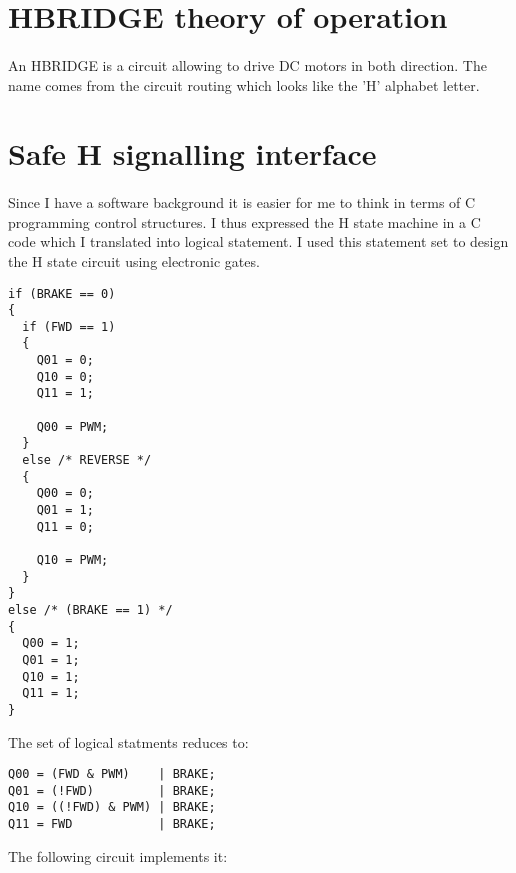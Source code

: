 \documentclass[12pt]{article}
\begin{document}
\section{HBRIDGE theory of operation}
\paragraph{} An HBRIDGE is a circuit allowing to drive DC motors in both direction. The name comes from the
circuit routing which looks like the 'H' alphabet letter.


\section{Safe H signalling interface}

\paragraph{} Since I have a software background it is easier for me to think in terms of C programming control
structures. I thus expressed the H state machine in a C code which I translated into logical statement. I used
this statement set to design the H state circuit using electronic gates.

\begin{tiny}
\lstset{language=C}
\begin{lstlisting}[frame=tb]
if (BRAKE == 0)
{
  if (FWD == 1)
  {
    Q01 = 0;
    Q10 = 0;
    Q11 = 1;

    Q00 = PWM;
  }
  else /* REVERSE */
  {
    Q00 = 0;
    Q01 = 1;
    Q11 = 0;

    Q10 = PWM;
  }
}
else /* (BRAKE == 1) */
{
  Q00 = 1;
  Q01 = 1;
  Q10 = 1;
  Q11 = 1;
}
\end{lstlisting}
\end{tiny}

The set of logical statments reduces to:
\begin{tiny}
\lstset{language=C}
\begin{lstlisting}[frame=tb]
Q00 = (FWD & PWM)    | BRAKE;
Q01 = (!FWD)         | BRAKE;
Q10 = ((!FWD) & PWM) | BRAKE;
Q11 = FWD            | BRAKE;
\end{lstlisting}
\end{tiny}

The following circuit implements it:


\end{document}
